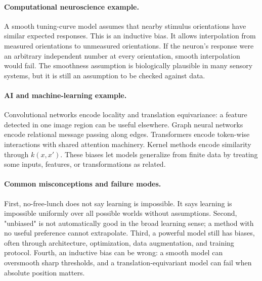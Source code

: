 \paragraph{Computational neuroscience example.}
A smooth tuning-curve model assumes that nearby stimulus orientations have similar expected responses. This is an inductive bias. It allows interpolation from measured orientations to unmeasured orientations. If the neuron's response were an arbitrary independent number at every orientation, smooth interpolation would fail. The smoothness assumption is biologically plausible in many sensory systems, but it is still an assumption to be checked against data.

\paragraph{AI and machine-learning example.}
Convolutional networks encode locality and translation equivariance: a feature detected in one image region can be useful elsewhere. Graph neural networks encode relational message passing along edges. Transformers encode token-wise interactions with shared attention machinery. Kernel methods encode similarity through \(k(x,x')\). These biases let models generalize from finite data by treating some inputs, features, or transformations as related.

\paragraph{Common misconceptions and failure modes.}
First, no-free-lunch does not say learning is impossible. It says learning is impossible uniformly over all possible worlds without assumptions. Second, "unbiased" is not automatically good in the broad learning sense; a method with no useful preference cannot extrapolate. Third, a powerful model still has biases, often through architecture, optimization, data augmentation, and training protocol. Fourth, an inductive bias can be wrong: a smooth model can oversmooth sharp thresholds, and a translation-equivariant model can fail when absolute position matters.


